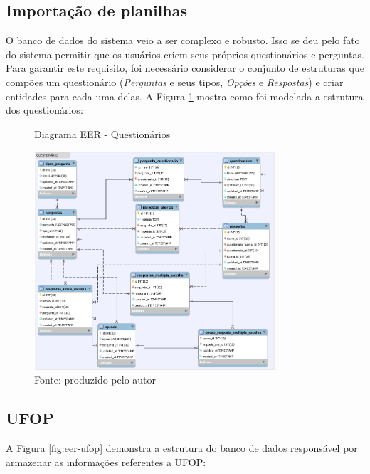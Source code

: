\documentclass[
  12pt,       %
  openright,      %
  oneside,      %
  a4paper,      %
  english,      %
  french,        %
  spanish,     %
  brazil        %
  ]{abntex2-decsi}
\begin{document}
	\subsection{Importação de planilhas}

    O banco de dados do sistema veio a ser complexo e robusto. Isso se deu pelo fato do sistema permitir que os usuários criem seus próprios questionários e perguntas. Para garantir este requisito, foi necessário considerar o conjunto de estruturas que compões um questionário (\textit{Perguntas} e seus tipos, \textit{Opções} e \textit{Respostas}) e criar entidades para cada uma delas. A Figura \ref{fig:eer-questionario} mostra como foi modelada a estrutura dos questionários:

    \begin{figure}[h]
        \centering
        \caption{Diagrama EER - Questionários}
        \includegraphics[width=0.8\textwidth]{img/questionario_eer}
        \caption*{Fonte: produzido pelo autor}
        \label{fig:eer-questionario}
    \end{figure}

    \subsection{UFOP}
	
    A Figura \ref{fig:eer-ufop} demonstra a estrutura do banco de dados responsável por armazenar as informações referentes a UFOP:
    
\end{document}
